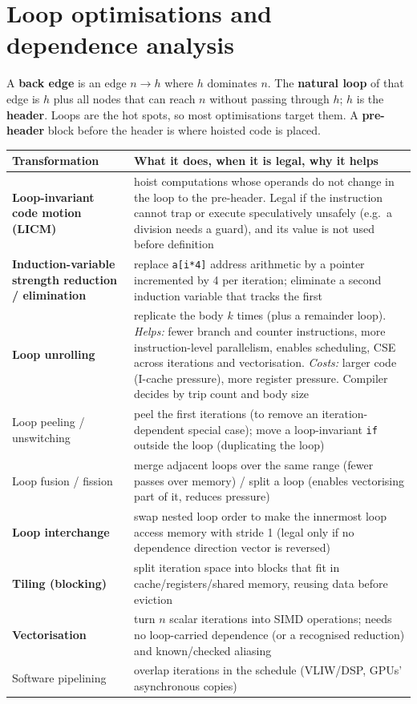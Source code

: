 \documentclass[10pt,a4paper,openany,oneside]{report}
\newcommand{\prio}[1]{\texorpdfstring{\ifcase#1\or{\color{gold}\ding{72}}\or{\color{gold}\ding{72}\ding{72}}\or{\color{gold}\ding{72}\ding{72}\ding{72}}\fi}{}}
\begin{document}
\section{Loop optimisations and dependence analysis \prio{3}}
\begin{defbox}
A \textbf{back edge} is an edge $n\to h$ where $h$ dominates $n$. The \textbf{natural loop} of that edge is $h$ plus all nodes that can reach $n$ without passing through $h$; $h$ is the \textbf{header}. Loops are the hot spots, so most optimisations target them. A \textbf{pre-header} block before the header is where hoisted code is placed.
\end{defbox}
\begin{center}\small
\begin{xltabular}{\textwidth}{@{}L{3.5cm}Y@{}}
\toprule
\textbf{Transformation} & \textbf{What it does, when it is legal, why it helps}\\
\midrule\endhead
\textbf{Loop-invariant code motion (LICM)} & hoist computations whose operands do not change in the loop to the pre-header. Legal if the instruction cannot trap or execute speculatively unsafely (e.g.\ a division needs a guard), and its value is not used before definition\\
\textbf{Induction-variable strength reduction / elimination} & replace \texttt{a[i*4]} address arithmetic by a pointer incremented by 4 per iteration; eliminate a second induction variable that tracks the first\\
\textbf{Loop unrolling} & replicate the body $k$ times (plus a remainder loop). \emph{Helps:} fewer branch and counter instructions, more instruction-level parallelism, enables scheduling, CSE across iterations and vectorisation. \emph{Costs:} larger code (I-cache pressure), more register pressure. Compiler decides by trip count and body size\\
Loop peeling / unswitching & peel the first iterations (to remove an iteration-dependent special case); move a loop-invariant \texttt{if} outside the loop (duplicating the loop)\\
Loop fusion / fission & merge adjacent loops over the same range (fewer passes over memory) / split a loop (enables vectorising part of it, reduces pressure)\\
\textbf{Loop interchange} & swap nested loop order to make the innermost loop access memory with stride 1 (legal only if no dependence direction vector is reversed)\\
\textbf{Tiling (blocking)} & split iteration space into blocks that fit in cache/registers/shared memory, reusing data before eviction\\
\textbf{Vectorisation} & turn $n$ scalar iterations into SIMD operations; needs no loop-carried dependence (or a recognised reduction) and known/checked aliasing\\
Software pipelining & overlap iterations in the schedule (VLIW/DSP, GPUs' asynchronous copies)\\
\bottomrule
\end{xltabular}
\end{center}
\end{document}
